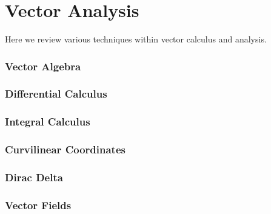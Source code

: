 \newpage
\chapter{Vector Analysis}
\label{app:vec-analysis}
Here we review various techniques within vector calculus and analysis.

\subsection{Vector Algebra}
\subsection{Differential Calculus}
\subsection{Integral Calculus}
\subsection{Curvilinear Coordinates}
\subsection{Dirac Delta}
\subsection{Vector Fields}